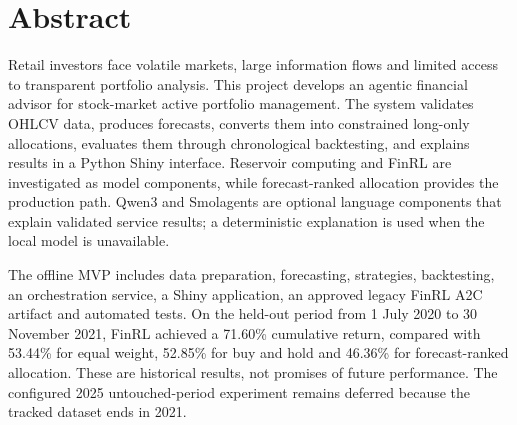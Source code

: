 \chapter*{Abstract}
Retail investors face volatile markets, large information flows and limited access to transparent portfolio analysis. This project develops an agentic financial advisor for stock-market active portfolio management. The system validates OHLCV data, produces forecasts, converts them into constrained long-only allocations, evaluates them through chronological backtesting, and explains results in a Python Shiny interface. Reservoir computing and FinRL are investigated as model components, while forecast-ranked allocation provides the production path. Qwen3 and Smolagents are optional language components that explain validated service results; a deterministic explanation is used when the local model is unavailable.

The offline MVP includes data preparation, forecasting, strategies, backtesting, an orchestration service, a Shiny application, an approved legacy FinRL A2C artifact and automated tests. On the held-out period from 1 July 2020 to 30 November 2021, FinRL achieved a 71.60\% cumulative return, compared with 53.44\% for equal weight, 52.85\% for buy and hold and 46.36\% for forecast-ranked allocation. These are historical results, not promises of future performance. The configured 2025 untouched-period experiment remains deferred because the tracked dataset ends in 2021.
